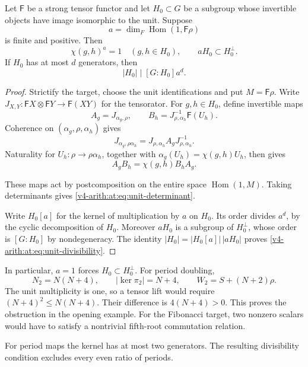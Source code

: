 \begin{proposition}
\label{v4-arith:at:prop:unit-multiplicity}
Let $\mathsf F$ be a strong tensor functor and let $H_0\subset G$
be a subgroup whose invertible objects have image isomorphic to the
unit. Suppose
\[
 a=\dim_F\operatorname{Hom}(1,\mathsf F\rho)
\]
is finite and positive. Then
\begin{equation}\label{v4-arith:at:eq:unit-determinant}
 \chi(g,h)^a=1\quad(g,h\in H_0),\qquad
 aH_0\subset H_0^\perp.
\end{equation}
If $H_0$ has at most $d$ generators, then
\begin{equation}\label{v4-arith:at:eq:unit-divisibility}
 |H_0|\mid [G:H_0]a^d.
\end{equation}
\end{proposition}
\begin{proof}
Strictify the target, choose the unit identifications and put
\(M=\mathsf F\rho\). Write
\(J_{X,Y}:\mathsf F X\otimes\mathsf F Y\to\mathsf F(XY)\)
for the tensorator. For \(g,h\in H_0\), define invertible maps
\[
 A_g=J_{\alpha_g,\rho},\qquad
 B_h=J_{\rho,\alpha_h}^{-1}\mathsf F(U_h).
\]
Coherence on \((\alpha_g,\rho,\alpha_h)\) gives
\[
 J_{\alpha_g,\rho\alpha_h}
 =J_{\rho,\alpha_h}A_gJ_{\rho,\alpha_h}^{-1}.
\]
Naturality for \(U_h:\rho\to\rho\alpha_h\), together with
\(\alpha_g(U_h)=\chi(g,h)U_h\), then gives
\[
 A_gB_h=\chi(g,h)B_hA_g.
\]

These maps act by postcomposition on the entire space
\(\operatorname{Hom}(1,M)\).
Taking determinants gives \eqref{v4-arith:at:eq:unit-determinant}.

Write $H_0[a]$ for the kernel of
multiplication by $a$ on $H_0$. Its order divides $a^d$, by the cyclic
decomposition of $H_0$. Moreover $aH_0$ is a subgroup of $H_0^\perp$,
whose order is $[G:H_0]$ by nondegeneracy. The identity
$|H_0|=|H_0[a]|\,|aH_0|$ proves
\eqref{v4-arith:at:eq:unit-divisibility}.
\end{proof}

In particular, \(a=1\) forces \(H_0\subset H_0^\perp\).
For period doubling,
\[
 N_2=N(N+4),\qquad |\ker\pi_2|=N+4,\qquad
 W_2=S+(N+2)\rho.
\]
The unit multiplicity is one, so a tensor lift would require
\((N+4)^2\le N(N+4)\). Their difference is \(4(N+4)>0\).
This proves the obstruction in the opening example.
For the Fibonacci target, two nonzero scalars would have to
satisfy a nontrivial fifth-root commutation relation.

For period maps the kernel has at most two generators. The resulting
divisibility condition excludes every even ratio of periods.

